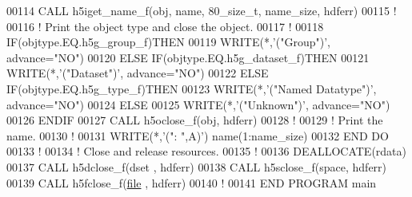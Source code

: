 \begin{DoxyCode}
00114      \textcolor{keyword}{CALL }h5iget\_name\_f(obj, name, 80\_size\_t, name\_size, hdferr)
00115      \textcolor{comment}{!}
00116      \textcolor{comment}{! Print the object type and close the object.}
00117      \textcolor{comment}{!}
00118      \textcolor{keywordflow}{IF}(objtype.EQ.h5g\_group\_f)\textcolor{keywordflow}{THEN}
00119         \textcolor{keyword}{WRITE}(*,\textcolor{stringliteral}{'("Group")'}, advance=\textcolor{stringliteral}{"NO"})
00120      \textcolor{keywordflow}{ELSE} \textcolor{keywordflow}{IF}(objtype.EQ.h5g\_dataset\_f)\textcolor{keywordflow}{THEN}
00121         \textcolor{keyword}{WRITE}(*,\textcolor{stringliteral}{'("Dataset")'}, advance=\textcolor{stringliteral}{"NO"})
00122      \textcolor{keywordflow}{ELSE} \textcolor{keywordflow}{IF}(objtype.EQ.h5g\_type\_f)\textcolor{keywordflow}{THEN}
00123         \textcolor{keyword}{WRITE}(*,\textcolor{stringliteral}{'("Named Datatype")'}, advance=\textcolor{stringliteral}{"NO"})
00124      \textcolor{keywordflow}{ELSE}
00125         \textcolor{keyword}{WRITE}(*,\textcolor{stringliteral}{'("Unknown")'}, advance=\textcolor{stringliteral}{"NO"})
00126 \textcolor{keywordflow}{     ENDIF}
00127      \textcolor{keyword}{CALL }h5oclose\_f(obj, hdferr)
00128      \textcolor{comment}{!}
00129      \textcolor{comment}{! Print the name.}
00130      \textcolor{comment}{!}
00131      \textcolor{keyword}{WRITE}(*,\textcolor{stringliteral}{'(": ",A)'}) name(1:name\_size)
00132 \textcolor{keywordflow}{  END DO}
00133   \textcolor{comment}{!}
00134   \textcolor{comment}{! Close and release resources.}
00135   \textcolor{comment}{!}
00136   \textcolor{keyword}{DEALLOCATE}(rdata)
00137   \textcolor{keyword}{CALL }h5dclose\_f(dset , hdferr)
00138   \textcolor{keyword}{CALL }h5sclose\_f(space, hdferr)
00139   \textcolor{keyword}{CALL }h5fclose\_f(\hyperlink{structfile}{file} , hdferr)
00140   \textcolor{comment}{!}
00141 \textcolor{keyword}{  END PROGRAM }main
\end{DoxyCode}
